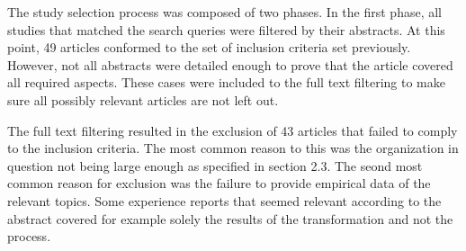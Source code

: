 The study selection process was composed of two phases. In the first phase, all
studies that matched the search queries were filtered by their abstracts. At
this point, 49 articles conformed to the set of inclusion criteria set
previously. However, not all abstracts were detailed enough to prove that the
article covered all required aspects. These cases were included to the full text
filtering to make sure all possibly relevant articles are not left out.

The full text filtering resulted in the exclusion of 43 articles that failed to
comply to the inclusion criteria. The most common reason to this was the
organization in question not being large enough as specified in section 2.3.
The seond most common reason for exclusion was the failure to provide empirical
data of the relevant topics. Some experience reports that seemed relevant
according to the abstract covered for example solely the results of the
transformation and not the process.
